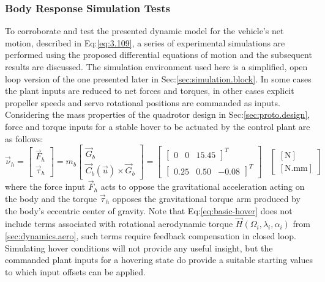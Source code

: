 \subsubsection{Body Response Simulation Tests}
\label{subsubsec:dynamicsimulation}
To corroborate and test the presented dynamic model for the vehicle's net motion, described in Eq:\ref{eq:3.109}, a series of experimental simulations are performed using the proposed differential equations of motion and the subsequent results are discussed. The simulation environment used here is a simplified, open loop version of the one presented later in Sec:\ref{sec:simulation.block}. In some cases the plant inputs are reduced to net forces and torques, in other cases explicit propeller speeds and servo rotational positions are commanded as inputs. Considering the mass properties of the quadrotor design in Sec:\ref{sec:proto.design}, force and torque inputs for a stable hover to be actuated by the control plant are as follows:
\begin{equation}\label{eq:basic-hover}
\vec{\nu}_h=\begin{bmatrix}
\vec{F}_h\\
\vec{\tau}_h
\end{bmatrix}=m_b\begin{bmatrix}
\vec{G}_b\\
\vec{C}_b(\vec{u})\times \vec{G}_b
\end{bmatrix}=\begin{bmatrix}
\begin{bmatrix}
0 & 0 & 15.45
\end{bmatrix}^T
\\
\begin{bmatrix}
0.25 & 0.50 & -0.08
\end{bmatrix}^T
\end{bmatrix}
~~~~\begin{bmatrix}
[\text{N}]\\
[\text{N.mm}]
\end{bmatrix}
\end{equation}
where the force input $\vec{F}_h$ acts to oppose the gravitational acceleration acting on the body and the torque $\vec{\tau}_h$ opposes the gravitational torque arm produced by the body's eccentric center of gravity. Note that Eq:\ref{eq:basic-hover} does not include terms associated with rotational aerodynamic torque $\vec{H}(\Omega_i,\lambda_i,\alpha_i)$ from \ref{sec:dynamics.aero}, such terms require feedback compensation in closed loop. Simulating hover conditions will not provide any useful insight, but the commanded plant inputs for a hovering state do provide a suitable starting values to which input offsets can be applied. 
